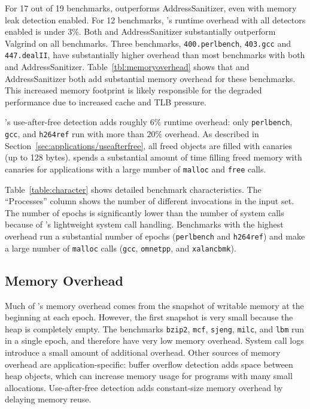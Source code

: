 For 17 out of 19 benchmarks, \doubletake{} outperforms AddressSanitizer, even with memory leak detection enabled. For 12 benchmarks, \doubletake{}'s runtime overhead with all detectors enabled is under 3\%. Both \doubletake{} and AddressSanitizer substantially outperform Valgrind on all benchmarks. Three benchmarks, \texttt{400.perlbench}, \texttt{403.gcc} and \texttt{447.dealII}, have substantially higher overhead than most benchmarks with both \doubletake{} and AddressSanitizer. Table~\ref{tbl:memoryoverhead} shows that \doubletake{} and AddressSanitizer both add substantial memory overhead for these benchmarks. This increased memory footprint is likely responsible for the degraded performance due to increased cache and TLB pressure.

\doubletake{}'s use-after-free detection adds roughly $6\%$ runtime overhead: only \texttt{perlbench}, \texttt{gcc}, and \texttt{h264ref} run with more than $20\%$ overhead. As described in Section~\ref{sec:applications/useafterfree}, all freed objects are filled with canaries (up to 128 bytes). \doubletake{} spends a substantial amount of time filling freed memory with canaries for applications with a large number of \texttt{malloc} and \texttt{free} calls.

Table~\ref{table:character} shows detailed benchmark characteristics. The ``Processes'' column shows the number of different invocations in the input set. The number of epochs is significantly lower than the number of system calls because of \doubletake{}'s lightweight system call handling. Benchmarks with the highest overhead run a substantial number of epochs (\texttt{perlbench} and \texttt{h264ref}) and make a large number of \texttt{malloc} calls (\texttt{gcc}, \texttt{omnetpp}, and \texttt{xalancbmk}).


\subsection{Memory Overhead}
\label{sec:evaluation/memory}

Much of \doubletake{}'s memory overhead comes from the snapshot of writable memory at the beginning at each epoch. However, the first snapshot is very small because the heap is completely empty. The benchmarks \texttt{bzip2}, \texttt{mcf}, \texttt{sjeng}, \texttt{milc}, and \texttt{lbm} run in a single epoch, and therefore have very low memory overhead. System call logs introduce a small amount of additional overhead. Other sources of memory overhead are application-specific: buffer overflow detection adds space between heap objects, which can increase memory usage for programs with many small allocations. Use-after-free detection adds constant-size memory overhead by delaying memory reuse.

